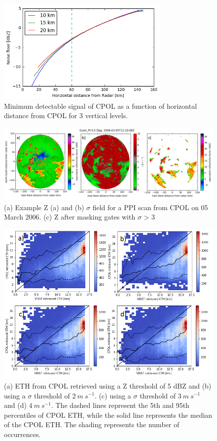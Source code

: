 \documentclass[journal abbreviation, manuscript]{copernicus}
\begin{document}
\clearpage
\begin{figure}[t]
\includegraphics[width=8.4cm]{Figure1.png}
\caption{Minimum detectable signal of CPOL as a function of horizontal distance from CPOL for 3 vertical levels.}
\label{fig:min_detectable_signal}
\end{figure}
\clearpage

\begin{figure}[t]
\includegraphics[width=18cm]{texture_filter_figure.png}
\caption{(a) Example Z (a) and (b) $\sigma$ field for a PPI scan from CPOL on 05 March 2006. (c) Z after masking gates with $\sigma$ > 3}
\label{fig:ref_field}
\end{figure}
\clearpage

\begin{figure}[t]
\includegraphics[width=18cm]{eth_comparison_figure.png}
\caption{(a) ETH from CPOL retrieved using a Z threshold of 5 dBZ and (b) using a $\sigma$ threshold of $2\ m\  s^{-1}$. (c) using a $\sigma$ threshold of $3\ m\ s^{-1}$ and (d) $4\ m\ s^{-1}$. The dashed lines represent the 5th and 95th percentiles of CPOL ETH, while the solid line represents the median of the CPOL ETH. The shading represents the number of occurrences.}
\label{fig:eth_comparison}
\end{figure}
\clearpage
\end{document}

